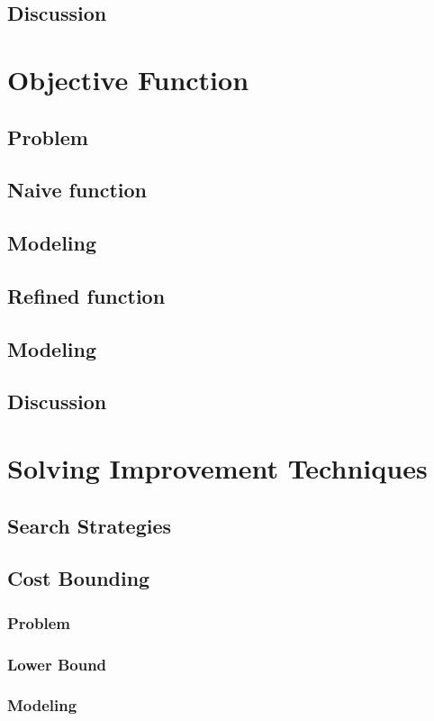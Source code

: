 \subsection{Discussion}

\section{Objective Function}
\subsection{Problem}
\subsection{Naive function}
\subsection{Modeling}
\subsection{Refined function}
\subsection{Modeling}
\subsection{Discussion}

\section{Solving Improvement Techniques}

\subsection{Search Strategies}

\subsection{Cost Bounding}
\subsubsection{Problem}
\subsubsection{Lower Bound}
\subsubsection{Modeling}
